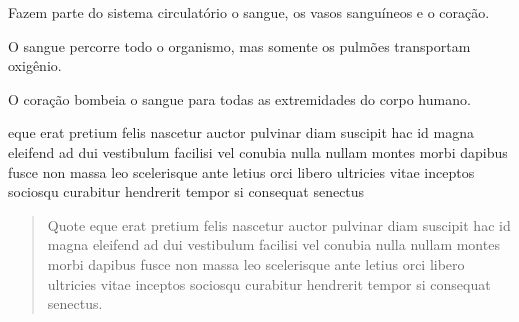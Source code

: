 \begin{boxlist}
 Fazem parte do sistema circulatório o sangue, os vasos sanguíneos e o coração.

 O sangue percorre todo o organismo, mas somente os pulmões transportam oxigênio.

 O coração bombeia o sangue para todas as extremidades do corpo humano.
\end{boxlist}

 eque erat pretium felis nascetur auctor pulvinar diam suscipit hac
 id magna eleifend ad dui vestibulum facilisi vel conubia nulla nullam montes
 morbi dapibus fusce non massa leo scelerisque ante letius orci libero
 ultricies vitae inceptos sociosqu curabitur hendrerit tempor si consequat
 senectus


\lipsum[1]




\begin{quotation}
 Quote eque erat pretium felis nascetur auctor pulvinar diam suscipit hac
 id magna eleifend ad dui vestibulum facilisi vel conubia nulla nullam montes
 morbi dapibus fusce non massa leo scelerisque ante letius orci libero
 ultricies vitae inceptos sociosqu curabitur hendrerit tempor si consequat
 senectus.

\end{quotation}